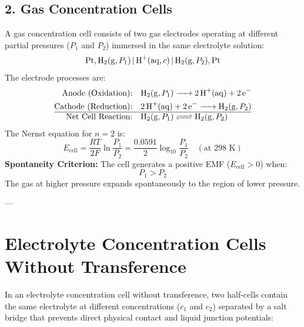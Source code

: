 \subsection{2. Gas Concentration Cells}
A gas concentration cell consists of two gas electrodes operating at different partial pressures ($P_1$ and $P_2$) immersed in the same electrolyte solution:
\begin{equation}
    \ce{Pt, H2(g, } P_1\ce{) | H+(aq, } c\ce{) | H2(g, } P_2\ce{), Pt}
\end{equation}
The electrode processes are:
\begin{align}
    \text{Anode (Oxidation):} \quad & \ce{H2(g, } P_1\ce{) -> 2H+(aq) + 2e^-} \\
    \text{Cathode (Reduction):} \quad & \ce{2H+(aq) + 2e^- -> H2(g, } P_2\ce{)} \\
    \hline
    \text{Net Cell Reaction:} \quad & \ce{H2(g, } P_1\ce{) <=> H2(g, } P_2\ce{)}
\end{align}
The Nernst equation for $n = 2$ is:
\begin{equation}
    \boxed{E_{\text{cell}} = \frac{RT}{2F} \ln \frac{P_1}{P_2} = \frac{0.0591}{2} \log_{10} \frac{P_1}{P_2}} \quad (\text{at } 298\text{ K})
\end{equation}
\textbf{Spontaneity Criterion:}
The cell generates a positive EMF ($E_{\text{cell}} > 0$) when:
\begin{equation}
    \boxed{P_1 > P_2}
\end{equation}
The gas at higher pressure expands spontaneously to the region of lower pressure.

---

\section{Electrolyte Concentration Cells Without Transference}

In an electrolyte concentration cell without transference, two half-cells contain the same electrolyte at different concentrations ($c_1$ and $c_2$) separated by a salt bridge that prevents direct physical contact and liquid junction potentials:


